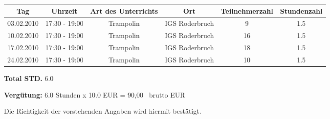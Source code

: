 \documentclass[a4paper,10pt,BCOR=0mm]{scrreprt}
\begin{document}
\begin{flushright}
\begin{tabular}{|c|c|c|c|c|c|}\hline
 \textbf{Tag}
&
 \textbf{Uhrzeit}
&
 \textbf{Art des Unterrichts}
&
\textbf{Ort}
&
\textbf{Teilnehmerzahl}
&
 \textbf{Stundenzahl}\\\hline\hline

03.02.2010
&
17:30 - 19:00
&
Trampolin
&
IGS Roderbruch
&
9
&
1.5
\\\hline


10.02.2010
&
17:30 - 19:00
&
Trampolin
&
IGS Roderbruch
&
16
&
1.5
\\\hline


17.02.2010
&
17:30 - 19:00
&
Trampolin
&
IGS Roderbruch
&
18
&
1.5
\\\hline


24.02.2010
&
17:30 - 19:00
&
Trampolin
&
IGS Roderbruch
&
10
&
1.5
\\\hline



\end{tabular} 
\begin{flushright}
\parbox{5cm}{\textbf{Total STD.} 6.0}\end{flushright}
\hfill\hfill \textbf{Vergütung:} 6.0 Stunden x 10.0 EUR = 90,00 \officialeuro\  brutto EUR \hspace*{2cm}\\
\end{flushright}
\vfill
Die Richtigkeit der vorstehenden Angaben wird hiermit bestätigt.\\
\end{document}

